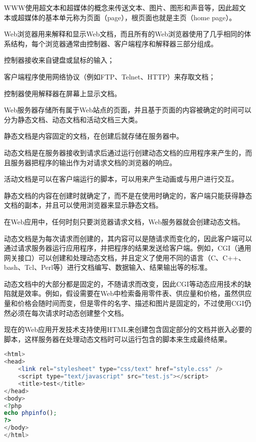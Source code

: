 WWW使用超文本和超媒体的概念来传送文本、图片、图形和声音等，因此超文本或超媒体的基本单元称为页面（page），根页面也就是主页（home page）。

Web浏览器用来解释和显示Web文档，而且所有的Web浏览器使用了几乎相同的体系结构，每个浏览器通常由控制器、客户端程序和解释器三部分组成。

\begin{compactitem}
\item 控制器接收来自键盘或鼠标的输入；
\item 客户端程序使用网络协议（例如FTP、Telnet、HTTP）来存取文档；
\item 控制器使用解释器在屏幕上显示文档。
\end{compactitem}

Web服务器存储所有属于Web站点的页面，并且基于页面的内容被确定的时间可以分为静态文档、动态文档和活动文档三大类。

\begin{compactitem}
\item 静态文档是内容固定的文档，在创建后就存储在服务器中。
\item 动态文档是在服务器接收到请求后通过运行创建动态文档的应用程序来产生的，而且服务器把程序的输出作为对请求文档的浏览器的响应。
\item 活动文档是可以在客户端运行的脚本，可以用来产生动画或与用户进行交互。
\end{compactitem}

静态文档的内容在创建时就确定了，而不是在使用时确定的，客户端只能获得静态文档的副本，并且可以使用浏览器来显示静态文档。

在Web应用中，任何时刻只要浏览器请求文档，Web服务器就会创建动态文档。

动态文档是为每次请求而创建的，其内容可以是随请求而变化的，因此客户端可以通过请求服务器运行应用程序，并把程序的结果发送给客户端。例如，CGI（通用网关接口）可以创建和处理动态文档，并且定义了使用不同的语言（C、C++、bash、Tcl、Perl等）进行文档编写、数据输入、结果输出等的标准。

动态文档中的大部分都是固定的，不随请求而改变，因此CGI等动态应用技术的缺陷就是效率。例如，假设需要在Web中检索备用零件表、供应量和价格，虽然供应量和价格会随时间而变，但是零件的名字、描述和图片是固定的，不过使用CGI仍然必须在每次请求时动态创建整个文档。

现在的Web应用开发技术支持使用HTML来创建包含固定部分的文档并嵌入必要的脚本，这样服务器在处理动态文档时可以运行包含的脚本来生成最终结果。

\begin{lstlisting}[language=PHP]
<html>
<head>
	<link rel="stylesheet" type="css/text" href="style.css" />
	<script type="text/javascript" src="test.js"></script>
	<title>test</title>
</head>
<body>
<?php
echo phpinfo();
?>
</body>
</html>
\end{lstlisting}

